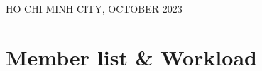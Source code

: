 \documentclass[a4paper]{article}
\begin{document}
\begin{titlepage}

\vspace*{1cm}
	

\begin{center}
{\footnotesize HO CHI MINH CITY, OCTOBER 2023}
\end{center}
\end{titlepage}



\newpage
\tableofcontents
\newpage


\section{Member list \& Workload}
\end{document}

